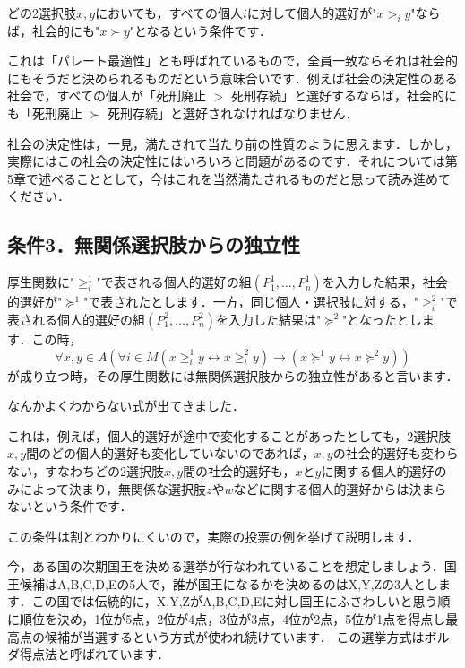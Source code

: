 どの2選択肢$x,y$においても，すべての個人$i$に対して個人的選好が"$x >_i y$"ならば，社会的にも"$x \succ y$"となるという条件です．

これは「パレート最適性」とも呼ばれているもので，全員一致ならそれは社会的にもそうだと決められるものだという意味合いです．例えば社会の決定性のある社会で，すべての個人が「死刑廃止 $>$ 死刑存続」と選好するならば，社会的にも「死刑廃止 $\succ$ 死刑存続」と選好されなければなりません．

社会の決定性は，一見，満たされて当たり前の性質のように思えます．しかし，実際にはこの社会の決定性にはいろいろと問題があるのです．それについては第5章で述べることとして，今はこれを当然満たされるものだと思って読み進めてください．

\subsection*{条件3．無関係選択肢からの独立性}
\begin{dfn}[無関係選択肢からの独立性]
    厚生関数に"$\geq^1_i$"で表される個人的選好の組$(P^1_1,\dots,P^1_n)$を入力した結果，社会的選好が"$\succeq^1$"で表されたとします．一方，同じ個人・選択肢に対する，"$\geq^2_i$"で表される個人的選好の組$(P^2_1,\dots,P^2_n)$を入力した結果は"$\succeq^2$"となったとします．この時，
    \begin{equation*}
        \forall x,y \in A (\forall i \in M (x \geq^1_i y \leftrightarrow x \geq^2_i y) \to (x \succeq^1 y \leftrightarrow x \succeq^2 y))
    \end{equation*}
    が成り立つ時，その厚生関数には無関係選択肢からの独立性があると言います．
\end{dfn}

なんかよくわからない式が出てきました．

これは，例えば，個人的選好が途中で変化することがあったとしても，2選択肢$x,y$間のどの個人的選好も変化していないのであれば，$x,y$の社会的選好も変わらない，すなわちどの2選択肢$x,y$間の社会的選好も，$x$と$y$に関する個人的選好のみによって決まり，無関係な選択肢$z$や$w$などに関する個人的選好からは決まらないという条件です．

この条件は割とわかりにくいので，実際の投票の例を挙げて説明します．

今，ある国の次期国王を決める選挙が行なわれていることを想定しましょう．国王候補はA,B,C,D,Eの5人で，誰が国王になるかを決めるのはX,Y,Zの3人とします．この国では伝統的に，X,Y,ZがA,B,C,D,Eに対し国王にふさわしいと思う順に順位を決め，1位が5点，2位が4点，3位が3点，4位が2点，5位が1点を得点し最高点の候補が当選するという方式が使われ続けています．
この選挙方式はボルダ得点法と呼ばれています．

